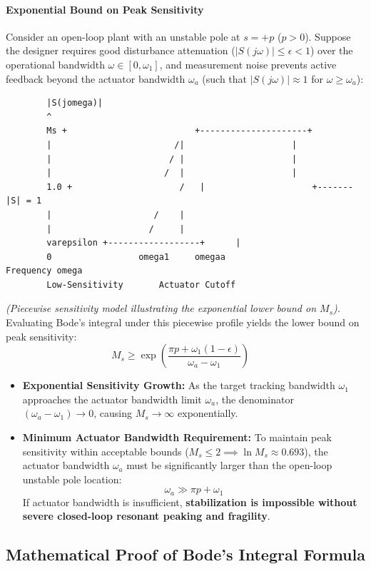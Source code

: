 \documentclass[12pt,onecolumn,twoside ]{article}
\begin{document}
	\paragraph{Exponential Bound on Peak Sensitivity}
	Consider an open-loop plant with an unstable pole at $s = +p$ ($p > 0$). Suppose the designer requires good disturbance attenuation ($|S(j\omega)| \le \epsilon < 1$) over the operational bandwidth $\omega \in [0, \omega_1]$, and measurement noise prevents active feedback beyond the actuator bandwidth $\omega_a$ (such that $|S(j\omega)| \approx 1$ for $\omega \ge \omega_a$):
	\begin{lstlisting}
		|S(jomega)|
		^
		Ms +                         +---------------------+
		|                        /|                     |
		|                       / |                     |
		|                      /  |                     |
		1.0 +                     /   |                     +------- |S| = 1
		|                    /    |
		|                   /     |
		varepsilon +------------------+      |
		0                 omega1     omegaa                             Frequency omega
		Low-Sensitivity       Actuator Cutoff
	\end{lstlisting}
	\textit{(Piecewise sensitivity model illustrating the exponential lower bound on $M_s$).}
	Evaluating Bode's integral under this piecewise profile yields the lower bound on peak sensitivity: \[
	M_s \ge \exp\left( \frac{\pi p + \omega_1(1 - \epsilon)}{\omega_a - \omega_1} \right) \quad
	\]
	\begin{itemize}
		\item
		\textbf{Exponential Sensitivity Growth:} As the target tracking bandwidth $\omega_1$ approaches the actuator bandwidth limit $\omega_a$, the denominator $(\omega_a - \omega_1) \to 0$, causing $M_s \to \infty$ exponentially.
		\item
		\textbf{Minimum Actuator Bandwidth Requirement:} To maintain peak sensitivity within acceptable bounds ($M_s \le 2 \implies \ln M_s \approx 0.693$), the actuator bandwidth $\omega_a$ must be significantly larger than the open-loop unstable pole location: \[
		\omega_a \gg \pi p + \omega_1
		\] If actuator bandwidth is insufficient, \textbf{stabilization is impossible without severe closed-loop resonant peaking and fragility}.
	\end{itemize}
	
	\subsection{Mathematical Proof of Bode's Integral Formula}
\end{document}

